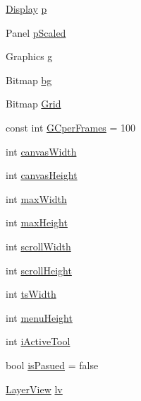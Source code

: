 \begin{DoxyCompactItemize}
\item 
\mbox{\hyperlink{class_paint___program_1_1_display}{Display}} \mbox{\hyperlink{class_paint___program_1_1_canvas_a062e8c62840a26ff882cc4d04df225ee}{p}}
\item 
Panel \mbox{\hyperlink{class_paint___program_1_1_canvas_a2b8da1cfbec0bf30e3c75ec1b2254e2b}{p\+Scaled}}
\item 
Graphics \mbox{\hyperlink{class_paint___program_1_1_canvas_aa6c67366d90077fa9b0628d9366bcbca}{g}}
\item 
Bitmap \mbox{\hyperlink{class_paint___program_1_1_canvas_a0cc3e58e865cf5a755d4d9f35f70238a}{bg}}
\item 
Bitmap \mbox{\hyperlink{class_paint___program_1_1_canvas_a19a0714ac47bc1320dcc9cefd12b380b}{Grid}}
\item 
const int \mbox{\hyperlink{class_paint___program_1_1_canvas_ac3c70713c3f72a4d4e8663dc90c10285}{G\+Cper\+Frames}} = 100
\item 
int \mbox{\hyperlink{class_paint___program_1_1_canvas_aa8fa583bc964d8ea68628c9b8e7e648a}{canvas\+Width}}
\item 
int \mbox{\hyperlink{class_paint___program_1_1_canvas_abee27e7eab8e6f5afb30044e97de2de2}{canvas\+Height}}
\item 
int \mbox{\hyperlink{class_paint___program_1_1_canvas_a0f7c080162d099242cfa35dc480c3ba9}{max\+Width}}
\item 
int \mbox{\hyperlink{class_paint___program_1_1_canvas_a1a8c4189ce38200f313962cad08a7fe3}{max\+Height}}
\item 
int \mbox{\hyperlink{class_paint___program_1_1_canvas_aaa74adb42b806ce50aa45a9b7501e042}{scroll\+Width}}
\item 
int \mbox{\hyperlink{class_paint___program_1_1_canvas_acc89dc931642d1b1874c96781f67932e}{scroll\+Height}}
\item 
int \mbox{\hyperlink{class_paint___program_1_1_canvas_ab971915f406e70cbe0b793ff8bfa44ad}{ts\+Width}}
\item 
int \mbox{\hyperlink{class_paint___program_1_1_canvas_af7619a49de47ab8a829b7d54cd13fa34}{menu\+Height}}
\item 
int \mbox{\hyperlink{class_paint___program_1_1_canvas_a069f9fb1fdfda2efb72002def8de69b8}{i\+Active\+Tool}}
\item 
bool \mbox{\hyperlink{class_paint___program_1_1_canvas_ae594f00ab27c7c5535b99ef3ea83330f}{is\+Pasued}} = false
\item 
\mbox{\hyperlink{class_paint___program_1_1_layer_view}{Layer\+View}} \mbox{\hyperlink{class_paint___program_1_1_canvas_a76ad801807be5089e7fa17fb5e49cd87}{lv}}

\end{DoxyCompactItemize}
